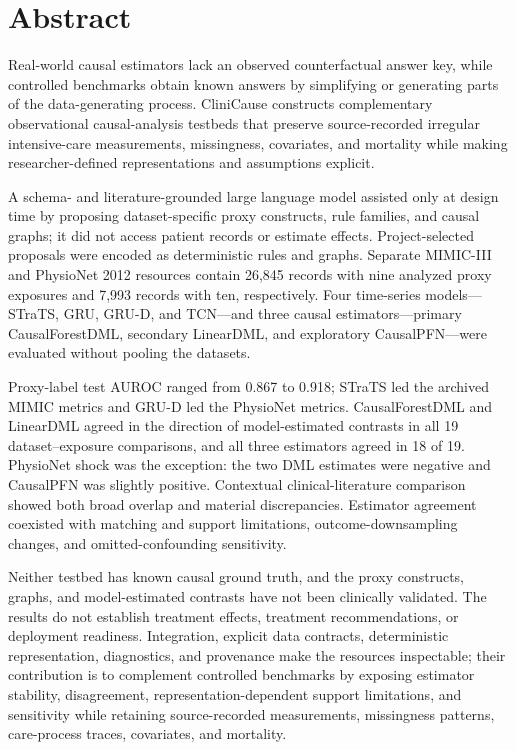 \chapter*{Abstract}

Real-world causal estimators lack an observed counterfactual answer key, while controlled benchmarks obtain known answers by simplifying or generating parts of the data-generating process. CliniCause constructs complementary observational causal-analysis testbeds that preserve source-recorded irregular intensive-care measurements, missingness, covariates, and mortality while making researcher-defined representations and assumptions explicit.

A schema- and literature-grounded large language model assisted only at design time by proposing dataset-specific proxy constructs, rule families, and causal graphs; it did not access patient records or estimate effects. Project-selected proposals were encoded as deterministic rules and graphs. Separate MIMIC-III and PhysioNet 2012 resources contain 26,845 records with nine analyzed proxy exposures and 7,993 records with ten, respectively. Four time-series models—STraTS, GRU, GRU\mbox{-}D, and TCN—and three causal estimators—primary CausalForestDML, secondary LinearDML, and exploratory CausalPFN—were evaluated without pooling the datasets.

Proxy-label test AUROC ranged from 0.867 to 0.918; STraTS led the archived MIMIC metrics and GRU\mbox{-}D led the PhysioNet metrics. CausalForestDML and LinearDML agreed in the direction of model-estimated contrasts in all 19 dataset–exposure comparisons, and all three estimators agreed in 18 of 19. PhysioNet shock was the exception: the two DML estimates were negative and CausalPFN was slightly positive. Contextual clinical-literature comparison showed both broad overlap and material discrepancies. Estimator agreement coexisted with matching and support limitations, outcome-downsampling changes, and omitted-confounding sensitivity.

Neither testbed has known causal ground truth, and the proxy constructs, graphs, and model-estimated contrasts have not been clinically validated. The results do not establish treatment effects, treatment recommendations, or deployment readiness. Integration, explicit data contracts, deterministic representation, diagnostics, and provenance make the resources inspectable; their contribution is to complement controlled benchmarks by exposing estimator stability, disagreement, representation-dependent support limitations, and sensitivity while retaining source-recorded measurements, missingness patterns, care-process traces, covariates, and mortality.
